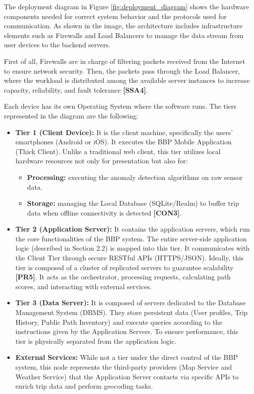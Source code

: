 The deployment diagram in Figure \ref{fig:deployment_diagram} shows the hardware components needed for correct system behavior and the protocols used for communication.
As shown in the image, the architecture includes infrastructure elements such as Firewalls and Load Balancers to manage the data stream from user devices to the backend servers.

First of all, Firewalls are in charge of filtering packets received from the Internet to ensure network security. Then, the packets pass through the Load Balancer, where the workload is distributed among the available server instances to increase capacity, reliability, and fault tolerance \textbf{[SSA4]}.

Each device has its own Operating System where the software runs. The tiers represented in the diagram are the following:

\begin{itemize}
    \item \textbf{Tier 1 (Client Device):} It is the client machine, specifically the users' smartphones (Android or iOS). It executes the BBP Mobile Application (Thick Client). Unlike a traditional web client, this tier utilizes local hardware resources not only for presentation but also for:
    \begin{itemize}
        \item \textbf{Processing:} executing the anomaly detection algorithms on raw sensor data.
        \item \textbf{Storage:} managing the Local Database (SQLite/Realm) to buffer trip data when offline connectivity is detected \textbf{[CON3]}.
    \end{itemize}

    \item \textbf{Tier 2 (Application Server):} It contains the application servers, which run the core functionalities of the BBP system. The entire server-side application logic (described in Section 2.2) is mapped into this tier.
    It communicates with the Client Tier through secure RESTful APIs (HTTPS/JSON). Ideally, this tier is composed of a cluster of replicated servers to guarantee scalability \textbf{ [PR5]}. It acts as the orchestrator, processing requests, calculating path scores, and interacting with external services.

    \item \textbf{Tier 3 (Data Server):} It is composed of servers dedicated to the Database Management System (DBMS). They store persistent data (User profiles, Trip History, Public Path Inventory) and execute queries according to the instructions given by the Application Servers. To ensure performance, this tier is physically separated from the application logic.

    \item \textbf{External Services:} While not a tier under the direct control of the BBP system, this node represents the third-party providers (Map Service and Weather Service) that the Application Server contacts via specific APIs to enrich trip data and perform geocoding tasks.
\end{itemize}
\clearpage

